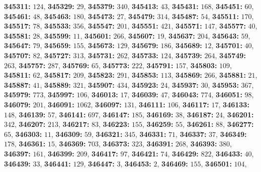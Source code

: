 \textsf{\bfseries 345311:} $124$, \textsf{\bfseries 345329:} $29$, \textsf{\bfseries 345379:} $340$, \textsf{\bfseries 345413:} $43$, \textsf{\bfseries 345431:} $168$, \textsf{\bfseries 345451:} $60$, \textsf{\bfseries 345461:} $48$, \textsf{\bfseries 345463:} $180$, \textsf{\bfseries 345473:} $27$, \textsf{\bfseries 345479:} $314$, \textsf{\bfseries 345487:} $54$, \textsf{\bfseries 345511:} $170$, \textsf{\bfseries 345517:} $78$, \textsf{\bfseries 345533:} $356$, \textsf{\bfseries 345547:} $201$, \textsf{\bfseries 345551:} $421$, \textsf{\bfseries 345571:} $147$, \textsf{\bfseries 345577:} $40$, \textsf{\bfseries 345581:} $28$, \textsf{\bfseries 345599:} $11$, \textsf{\bfseries 345601:} $266$, \textsf{\bfseries 345607:} $19$, \textsf{\bfseries 345637:} $204$, \textsf{\bfseries 345643:} $59$, \textsf{\bfseries 345647:} $79$, \textsf{\bfseries 345659:} $155$, \textsf{\bfseries 345673:} $129$, \textsf{\bfseries 345679:} $186$, \textsf{\bfseries 345689:} $12$, \textsf{\bfseries 345701:} $40$, \textsf{\bfseries 345707:} $82$, \textsf{\bfseries 345727:} $313$, \textsf{\bfseries 345731:} $262$, \textsf{\bfseries 345733:} $124$, \textsf{\bfseries 345739:} $264$, \textsf{\bfseries 345749:} $263$, \textsf{\bfseries 345757:} $287$, \textsf{\bfseries 345769:} $65$, \textsf{\bfseries 345773:} $222$, \textsf{\bfseries 345791:} $157$, \textsf{\bfseries 345803:} $109$, \textsf{\bfseries 345811:} $62$, \textsf{\bfseries 345817:} $209$, \textsf{\bfseries 345823:} $291$, \textsf{\bfseries 345853:} $113$, \textsf{\bfseries 345869:} $266$, \textsf{\bfseries 345881:} $21$, \textsf{\bfseries 345887:} $41$, \textsf{\bfseries 345889:} $321$, \textsf{\bfseries 345907:} $434$, \textsf{\bfseries 345923:} $24$, \textsf{\bfseries 345937:} $30$, \textsf{\bfseries 345953:} $367$, \textsf{\bfseries 345979:} $773$, \textsf{\bfseries 345997:} $106$, \textsf{\bfseries 346013:} $17$, \textsf{\bfseries 346039:} $47$, \textsf{\bfseries 346043:} $774$, \textsf{\bfseries 346051:} $98$, \textsf{\bfseries 346079:} $201$, \textsf{\bfseries 346091:} $1062$, \textsf{\bfseries 346097:} $131$, \textsf{\bfseries 346111:} $106$, \textsf{\bfseries 346117:} $17$, \textsf{\bfseries 346133:} $148$, \textsf{\bfseries 346139:} $57$, \textsf{\bfseries 346141:} $697$, \textsf{\bfseries 346147:} $185$, \textsf{\bfseries 346169:} $38$, \textsf{\bfseries 346187:} $24$, \textsf{\bfseries 346201:} $342$, \textsf{\bfseries 346207:} $213$, \textsf{\bfseries 346217:} $83$, \textsf{\bfseries 346223:} $155$, \textsf{\bfseries 346259:} $55$, \textsf{\bfseries 346261:} $88$, \textsf{\bfseries 346277:} $65$, \textsf{\bfseries 346303:} $11$, \textsf{\bfseries 346309:} $59$, \textsf{\bfseries 346321:} $345$, \textsf{\bfseries 346331:} $71$, \textsf{\bfseries 346337:} $37$, \textsf{\bfseries 346349:} $178$, \textsf{\bfseries 346361:} $15$, \textsf{\bfseries 346369:} $703$, \textsf{\bfseries 346373:} $323$, \textsf{\bfseries 346391:} $268$, \textsf{\bfseries 346393:} $380$, \textsf{\bfseries 346397:} $161$, \textsf{\bfseries 346399:} $209$, \textsf{\bfseries 346417:} $97$, \textsf{\bfseries 346421:} $74$, \textsf{\bfseries 346429:} $822$, \textsf{\bfseries 346433:} $40$, \textsf{\bfseries 346439:} $33$, \textsf{\bfseries 346441:} $129$, \textsf{\bfseries 346447:} $3$, \textsf{\bfseries 346453:} $2$, \textsf{\bfseries 346469:} $155$, \textsf{\bfseries 346501:} $104$, 
